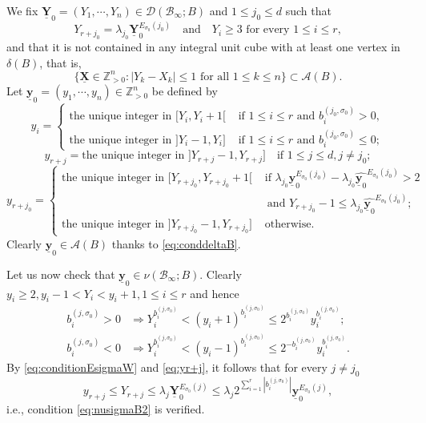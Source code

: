 \documentclass[11pt,letterpaper]{amsart}
\newcommand{\BZ}{{\mathbb {Z}}}
\newcommand{\CA}{{\mathcal {A}}}
\newcommand{\CB}{{\mathcal {B}}}
\newcommand{\CD}{{\mathcal {D}}}
\newcommand{\XX}{\underline{\mathbf{X}}}
\newcommand{\YY}{\underline{\mathbf{Y}}}
\newcommand{\yy}{\underline{\mathbf{y}}}
\theoremstyle{plain}
\numberwithin{equation}{section}
\theoremstyle{definition}
\theoremstyle{remark}
\begin{document}
We fix $\YY_0=(Y_1,\cdots,Y_n)\in \CD(\CB_\infty;B)$ and $1\leqslant j_0\leqslant d$ such that $$Y_{r+j_0}=\lambda_{j_0}\YY_0^{E_{\sigma_0}(j_0)}\quad\text{and}\quad Y_i\geqslant 3\text{ for every }1\leqslant i\leqslant r,$$ and that it is not contained in any integral unit cube with at least one vertex in $\delta(B)$, that is, \begin{equation}\label{eq:conddeltaB}
	\{\XX\in\BZ_{>0}^n: |Y_k-X_k|\leqslant 1\text{ for all }1\leqslant k\leqslant n\}\subset \CA(B).
\end{equation} Let $\yy_{0}=(y_1,\cdots,y_n)\in\BZ_{>0}^n$ be defined by
\begin{equation}\label{eq:yi1}
	y_i=\begin{cases}
		\text{the unique integer in } [Y_i,Y_i+1[ & \text{ if } 1\leqslant i\leqslant r \text{ and } b_{i}^{(j_0,\sigma_0)}>0,\\ \text{the unique integer in } ]Y_i-1,Y_i] & \text{ if } 1\leqslant i\leqslant r \text{ and } b_{i}^{(j_0,\sigma_0)}\leqslant 0;
	\end{cases}
\end{equation}
\begin{equation}\label{eq:yr+j}
	y_{r+j}=\text{the unique integer in } ]Y_{r+j}-1,Y_{r+j}]\quad \text{if } 1\leqslant j\leqslant d,j\neq j_0;
\end{equation}
	\begin{equation}\label{eq:yr+j0}
		y_{r+j_0}=\begin{cases}
			\text{the unique integer in } [Y_{r+j_0},Y_{r+j_0}+1[ & \text{ if } \lambda_{j_0}\yy_0^{E_{\sigma_0}(j_0)}-\lambda_{j_0}\widehat{\yy_0}^{E_{\sigma_0}(j_0)}> 2\\ &~\text{ and } Y_{r+j_0}-1\leqslant \lambda_{j_0}\widehat{\yy_0}^{E_{\sigma_0}(j_0)};\\ \text{the unique integer in } ]Y_{r+j_0}-1,Y_{r+j_0}] & \text{ otherwise}.
		\end{cases}
	\end{equation}
	Clearly $\yy_0\in\CA(B)$ thanks to \eqref{eq:conddeltaB}.
	
	Let us now check that $\yy_0\in\nu(\CB_\infty;B)$. Clearly $y_i\geqslant 2,y_i-1<Y_i<y_i+1,1\leqslant i\leqslant r$ and hence \begin{equation}\label{eq:casestar}
	\begin{split}
		b_i^{(j,\sigma_0)}>0 &\Longrightarrow Y_i^{b_i^{(j,\sigma_0)}}<(y_i+1)^{b_i^{(j,\sigma_0)}}\leqslant 2^{b_i^{(j,\sigma_0)}} y_i^{b_i^{(j,\sigma_0)}};\\ b_i^{(j,\sigma_0)}<0 & \Longrightarrow Y_i^{b_i^{(j,\sigma_0)}}<(y_i-1)^{b_i^{(j,\sigma_0)}}\leqslant 2^{-b_i^{(j,\sigma_0)}}y_i^{b_i^{(j,\sigma_0)}}.
	\end{split}	
\end{equation} By \eqref{eq:conditionEsigmaW}	 and \eqref{eq:yr+j}, it follows that for every $j\neq j_0$ \begin{equation}\label{eq:jneqj0}
y_{r+j}\leqslant Y_{r+j}\leqslant\lambda_{j}\YY_0^{E_{\sigma_0}(j)}\leqslant\lambda_{j} 2^{\sum_{i=1}^{r}|b_i^{(j,\sigma_0)}|}\yy_0^{E_{\sigma_0}(j)},
\end{equation}  i.e., condition \eqref{eq:nusigmaB2} is verified. 
\end{document}
